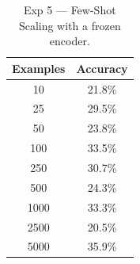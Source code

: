 \begin{table}[h!]
\centering
\caption{Exp 5 --- Few-Shot Scaling with a frozen encoder.}
\begin{tabular}{c c}
\hline
\textbf{Examples} & \textbf{Accuracy} \\
\hline
10 & 21.8\% \\
25 & 29.5\% \\
50 & 23.8\% \\
100 & 33.5\% \\
250 & 30.7\% \\
500 & 24.3\% \\
1000 & 33.3\% \\
2500 & 20.5\% \\
5000 & 35.9\% \\
\hline
\end{tabular}
\label{tab:cpu_exp5}
\end{table}

